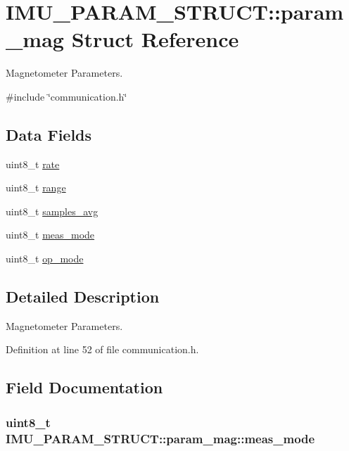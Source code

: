 \hypertarget{structIMU__PARAM__STRUCT_1_1param__mag}{\section{I\-M\-U\-\_\-\-P\-A\-R\-A\-M\-\_\-\-S\-T\-R\-U\-C\-T\-:\-:param\-\_\-mag Struct Reference}
\label{structIMU__PARAM__STRUCT_1_1param__mag}
}


Magnetometer Parameters.  




{\ttfamily \#include \char`\"{}communication.\-h\char`\"{}}

\subsection*{Data Fields}
\begin{DoxyCompactItemize}
\item 
uint8\-\_\-t \hyperlink{structIMU__PARAM__STRUCT_1_1param__mag_a234de95423b604b05b851ef90890cea1}{rate}
\item 
uint8\-\_\-t \hyperlink{structIMU__PARAM__STRUCT_1_1param__mag_a40ad27ebdb5fde35257b1dc52e40f476}{range}
\item 
uint8\-\_\-t \hyperlink{structIMU__PARAM__STRUCT_1_1param__mag_a52c22cae6940eb39fb72aca66cfeba9a}{samples\-\_\-avg}
\item 
uint8\-\_\-t \hyperlink{structIMU__PARAM__STRUCT_1_1param__mag_a1f3536709c05310005d648f339d70c54}{meas\-\_\-mode}
\item 
uint8\-\_\-t \hyperlink{structIMU__PARAM__STRUCT_1_1param__mag_a39b83b3e9ff5bdcafed0bdf6a2de584b}{op\-\_\-mode}
\end{DoxyCompactItemize}


\subsection{Detailed Description}
Magnetometer Parameters. 

Definition at line 52 of file communication.\-h.



\subsection{Field Documentation}
\hypertarget{structIMU__PARAM__STRUCT_1_1param__mag_a1f3536709c05310005d648f339d70c54}{
\subsubsection[{meas\-\_\-mode}]{\setlength{\rightskip}{0pt plus 5cm}uint8\-\_\-t I\-M\-U\-\_\-\-P\-A\-R\-A\-M\-\_\-\-S\-T\-R\-U\-C\-T\-::param\-\_\-mag\-::meas\-\_\-mode}}\label{structIMU__PARAM__STRUCT_1_1param__mag_a1f3536709c05310005d648f339d70c54}


